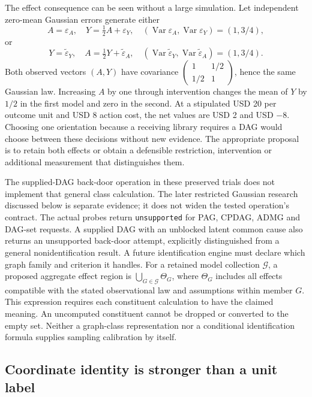 The effect consequence can be seen without a large simulation. Let independent
zero-mean Gaussian errors generate either
\[
 A=\varepsilon_A,\quad Y=\tfrac12 A+\varepsilon_Y,
 \quad (\operatorname{Var}\varepsilon_A,\operatorname{Var}\varepsilon_Y)
       =(1,3/4),
\]
or
\[
 Y=\widetilde\varepsilon_Y,\quad A=\tfrac12 Y+\widetilde\varepsilon_A,
 \quad (\operatorname{Var}\widetilde\varepsilon_Y,
        \operatorname{Var}\widetilde\varepsilon_A)=(1,3/4).
\]
Both observed vectors \((A,Y)\) have covariance
\(\left(\begin{smallmatrix}1&1/2\\1/2&1\end{smallmatrix}\right)\), hence the
same Gaussian law. Increasing \(A\) by one through intervention changes the
mean of \(Y\) by \(1/2\) in the first model and zero in the second. At a
stipulated USD 20 per outcome unit and USD 8 action cost, the net values are
USD 2 and USD \(-8\). Choosing one orientation because a receiving library
requires a DAG would choose between these decisions without new evidence.
The appropriate proposal is to retain both effects or obtain a defensible
restriction, intervention or additional measurement that distinguishes them.
\citep{exec16_topology_exact}

The supplied-DAG back-door operation in these preserved trials does not implement that general class calculation. The later restricted Gaussian research discussed below is separate evidence; it does not widen the tested operation's contract. The actual probes return \texttt{unsupported} for PAG,
CPDAG, ADMG and DAG-set requests. A supplied DAG with an unblocked latent
common cause also returns an unsupported back-door attempt, explicitly
distinguished from a general nonidentification result. A future identification
engine must declare which graph family and criterion it handles. For a
retained model collection \(\mathcal G\), a proposed aggregate effect region is
\(\bigcup_{G\in\mathcal G}\Theta_G\), where \(\Theta_G\) includes all effects
compatible with the stated observational law and assumptions within member
\(G\). This expression requires each constituent calculation to have the
claimed meaning. An uncomputed constituent cannot be dropped or converted to
the empty set. Neither a graph-class representation nor a conditional
identification formula supplies sampling calibration by itself.
\citep{exec16_topology_runtime}

\subsection{Coordinate identity is stronger than a unit label}

